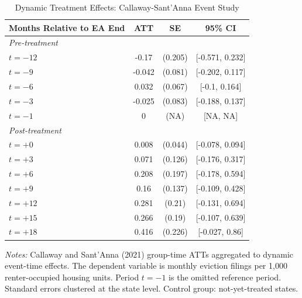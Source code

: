 \begin{table}[htbp]
\centering
\caption{Dynamic Treatment Effects: Callaway-Sant'Anna Event Study}
\label{tab:event}
\begin{tabular}{lccc}
\toprule
Months Relative to EA End & ATT & SE & 95\% CI \\
\midrule
\multicolumn{4}{l}{\textit{Pre-treatment}} \\
$t = -12$ & -0.17 & (0.205) & [-0.571, 0.232] \\
$t = -9$ & -0.042 & (0.081) & [-0.202, 0.117] \\
$t = -6$ & 0.032 & (0.067) & [-0.1, 0.164] \\
$t = -3$ & -0.025 & (0.083) & [-0.188, 0.137] \\
$t = -1$ & 0 & (NA) & [NA, NA] \\
\midrule
\multicolumn{4}{l}{\textit{Post-treatment}} \\
$t = +0$ & 0.008 & (0.044) & [-0.078, 0.094] \\
$t = +3$ & 0.071 & (0.126) & [-0.176, 0.317] \\
$t = +6$ & 0.208 & (0.197) & [-0.178, 0.594] \\
$t = +9$ & 0.16 & (0.137) & [-0.109, 0.428] \\
$t = +12$ & 0.281 & (0.21) & [-0.131, 0.694] \\
$t = +15$ & 0.266 & (0.19) & [-0.107, 0.639] \\
$t = +18$ & 0.416 & (0.226) & [-0.027, 0.86] \\
\bottomrule
\end{tabular}
\begin{tablenotes}
\item \textit{Notes:} Callaway and Sant'Anna (2021) group-time ATTs aggregated to dynamic event-time effects. The dependent variable is monthly eviction filings per 1,000 renter-occupied housing units. Period $t = -1$ is the omitted reference period. Standard errors clustered at the state level. Control group: not-yet-treated states.
\end{tablenotes}
\end{table}

